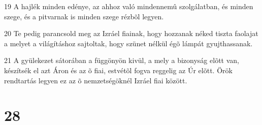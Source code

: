 \par 19 A hajlék minden edénye, az ahhoz való mindennemû szolgálatban, és minden szege, és a pitvarnak is minden szege rézbõl legyen.
\par 20 Te pedig parancsold meg az Izráel fiainak, hogy hozzanak néked tiszta faolajat a melyet a világításhoz sajtoltak, hogy szünet nélkül égõ lámpát gyujthassanak.
\par 21 A gyülekezet sátorában a függönyön kivül, a mely a bizonyság elõtt van, készítsék el azt Áron és az õ fiai, estvétõl fogva reggelig az Úr elõtt. Örök rendtartás legyen ez az õ nemzetségöknél Izráel fiai között.

\chapter{28}

